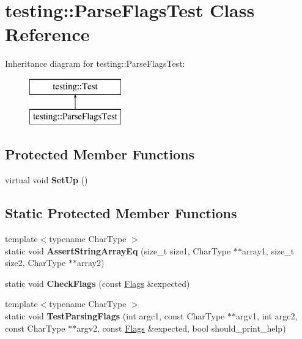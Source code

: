 \hypertarget{classtesting_1_1_parse_flags_test}{}\section{testing\+:\+:Parse\+Flags\+Test Class Reference}
\label{classtesting_1_1_parse_flags_test}
Inheritance diagram for testing\+:\+:Parse\+Flags\+Test\+:\begin{figure}[H]
\begin{center}
\leavevmode
\includegraphics[height=2.000000cm]{classtesting_1_1_parse_flags_test}
\end{center}
\end{figure}
\subsection*{Protected Member Functions}
\begin{DoxyCompactItemize}
\item 
\mbox{\label{classtesting_1_1_parse_flags_test_a72fd683f0bc0c2701d9a183c6b20cb48}} 
virtual void {\bfseries Set\+Up} ()
\end{DoxyCompactItemize}
\subsection*{Static Protected Member Functions}
\begin{DoxyCompactItemize}
\item 
\mbox{\label{classtesting_1_1_parse_flags_test_a5d93780e65e1aa304334a8d4372c51fc}} 
{\footnotesize template$<$typename Char\+Type $>$ }\\static void {\bfseries Assert\+String\+Array\+Eq} (size\+\_\+t size1, Char\+Type $\ast$$\ast$array1, size\+\_\+t size2, Char\+Type $\ast$$\ast$array2)
\item 
\mbox{\label{classtesting_1_1_parse_flags_test_a5919553c35ebe3910fcff51cc0b59fd6}} 
static void {\bfseries Check\+Flags} (const \mbox{\hyperlink{structtesting_1_1_flags}{Flags}} \&expected)
\item 
\mbox{\label{classtesting_1_1_parse_flags_test_ad769e5f5a71939c3a9ad853b415fa9d2}} 
{\footnotesize template$<$typename Char\+Type $>$ }\\static void {\bfseries Test\+Parsing\+Flags} (int argc1, const Char\+Type $\ast$$\ast$argv1, int argc2, const Char\+Type $\ast$$\ast$argv2, const \mbox{\hyperlink{structtesting_1_1_flags}{Flags}} \&expected, bool should\+\_\+print\+\_\+help)
\end{DoxyCompactItemize}
